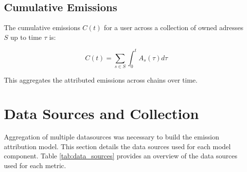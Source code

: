 \documentclass[11pt]{report}
\begin{document}
\subsection*{Cumulative Emissions}

The cumulative emissions $C(t)$ for a user across a collection of owned adresses $S$ up to time $\tau$ is:

\begin{equation}
    C(t) = \sum_{s \in S} \int_{0}^{t} A_s(\tau) d\tau
\end{equation}

This aggregates the attributed emissions across chains over time.

\section{Data Sources and Collection}

Aggregation of multiple datasources was necessary to build the emission attribution model. This section details the data sources used for each model component. Table \ref{tab:data_sources} provides an overview of the data sources used for each metric.
\end{document}
